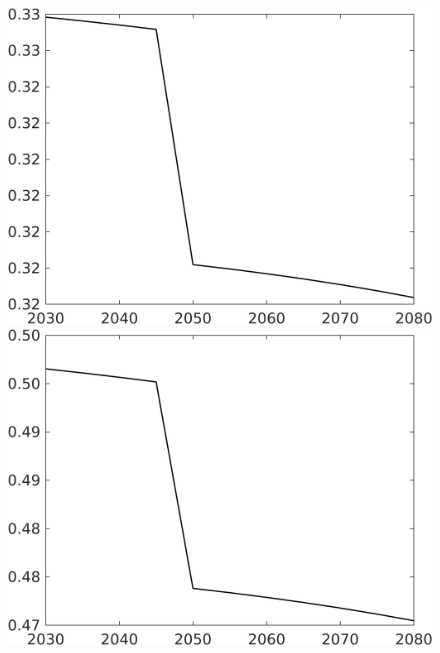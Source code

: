 \begin{figure}[h!!]
\begin{minipage}[]{0.32\textwidth}
\end{minipage}
\begin{minipage}[]{0.32\textwidth}
	\includegraphics[width=1\textwidth]{../../codding_model/own_basedOnFried/optimalPol_elastS_DisuSci/figures/all_1705/Single_OPT_T_NoTaus_hl_spillover0_sep1_etaa1.00.png}
\end{minipage}
\begin{minipage}[]{0.32\textwidth}
	\includegraphics[width=1\textwidth]{../../codding_model/own_basedOnFried/optimalPol_elastS_DisuSci/figures/all_1705/Single_OPT_T_NoTaus_hh_spillover0_sep1_etaa1.00.png}

\end{minipage}
\end{figure}
